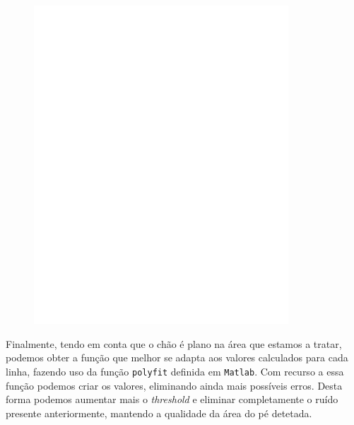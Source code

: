 \documentclass[a4paper]{report}
\begin{document}
\begin{figure}[H]
\begin{minipage}{.5\textwidth}
    \includegraphics[width=0.85\textwidth]{images/building/special_max_feet.png}
\end{minipage}%
\end{figure}

Finalmente, tendo em conta que o chão é plano na área que estamos a tratar, podemos
obter a função que melhor se adapta aos valores calculados para cada linha, fazendo
uso da função \texttt{polyfit} definida em \texttt{Matlab}. Com recurso a essa função podemos criar
os valores, eliminando ainda mais possíveis erros. Desta forma podemos aumentar mais o
\textit{threshold} e eliminar completamente o ruído presente anteriormente, mantendo a qualidade
da área do pé detetada.
\end{document}
